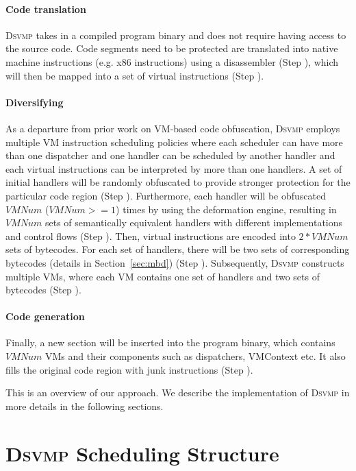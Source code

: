 \documentclass[preprint,12pt,3p]{elsarticle}
\newcommand{\DSVMP}{\textsc{Dsvmp }}
\begin{document}
\paragraph*{Code translation}
\DSVMP takes in a compiled program binary and does not require having access to the source code.
Code segments need to be protected are translated into native machine instructions (e.g. x86 instructions)
using a disassembler (Step ), which will then be mapped into a set of virtual instructions (Step ).

\paragraph*{Diversifying}
As a departure from prior work on VM-based code obfuscation, \DSVMP employs multiple VM instruction scheduling policies
where each scheduler can have more than one dispatcher and one handler can be scheduled by another handler
and each virtual instructions can be interpreted by more than one handlers.
A set of initial handlers will be randomly obfuscated to provide stronger protection for the particular code region (Step ).
Furthermore, each handler will be obfuscated $VMNum$ ($VMNum >= 1$) times by using the deformation engine, resulting in $VMNum$ sets of semantically equivalent handlers with different implementations and control flows (Step ). Then, virtual instructions are encoded into $2*VMNum$ sets of bytecodes. For each set of handlers, there will be two sets of corresponding bytecodes (details in Section~\ref {sec:mbd}) (Step ). Subsequently, \DSVMP constructs multiple VMs, where each VM contains one set of handlers and two sets of bytecodes (Step ).

\paragraph*{Code generation}
Finally, a new section will be inserted into the program binary, which contains $VMNum$ VMs and their components such as dispatchers, VMContext etc. It also fills the original code region with junk instructions (Step ).

This is an overview of our approach. We describe the implementation of \DSVMP in more details in the following sections.

\section{\DSVMP Scheduling Structure}\label{sec:dvs}
\end{document}
